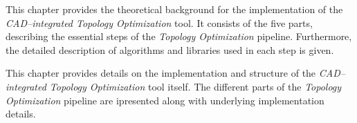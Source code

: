 \noindent This chapter provides the theoretical background for the implementation of the \textit{CAD--integrated Topology Optimization} tool. It consists of the five parts, describing the essential steps of the \textit{Topology Optimization} pipeline. Furthermore, the detailed description of algorithms and libraries used in each step is given.
\\

  \vspace{1mm}

\noindent This chapter provides details on the implementation and structure of the \textit{CAD--integrated Topology Optimization} tool itself. The different parts of the \textit{Topology Optimization} pipeline are ipresented along with underlying implementation details.
\\
